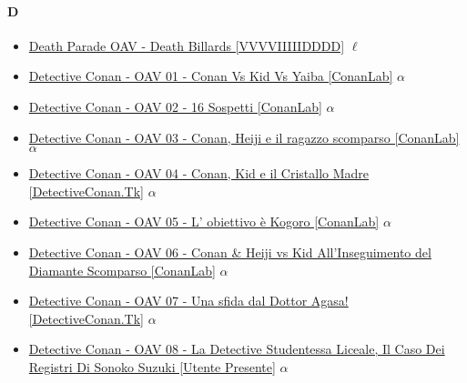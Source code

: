 			
		\paragraph{D} \hypertarget{OD}{}
			\begin{itemize}
				
				\item \href{https://mega.nz/#!rTRWQQBQ!IUJ2ek_EvBH3pUPuoJfsYFqzTUUDyRdXMZ48yZFay1Y} {Death Parade OAV - Death Billards [VVVVIIIIIDDDD]}  $\ell$   \\ 
				\item \href{https://mega.nz/#!9I8DhAoT!emtuSehpMr5CKseotyt5LFYb5sGwWfCU8kiga-ykeRs} {Detective Conan - OAV 01 - Conan Vs Kid Vs Yaiba [ConanLab]}  $\alpha$   \\ 
				\item \href{https://mega.nz/#!kQkHWARA!xxnoauQD3ulM5rS8aRJW2CLtaNuilP9X-mCr_GCB7Y4} {Detective Conan - OAV 02 - 16 Sospetti [ConanLab]}  $\alpha$   \\ 
				\item \href{https://mega.nz/#!5cUAWQ6A!FEAAstu6UVtJxRvAP2NTy9xPn3uZvRv2GJ3a3SJAK8s} {Detective Conan - OAV 03 - Conan, Heiji e il ragazzo scomparso [ConanLab]}  $\alpha$   \\ 
				\item \href{https://mega.nz/#!1I8wxYpI!-uFHEJs6pTecKJsATF6vuv3dWd2pXE_75OwbkrujQ_o} {Detective Conan - OAV 04 - Conan, Kid e il Cristallo Madre [DetectiveConan.Tk]}  $\alpha$   \\ 
				\item \href{https://mega.nz/#!4MVxSBKS!c_7F3Hc-caYVqQN-fwzx5QmHTDK5HQweziOIjUu4hGk} {Detective Conan - OAV 05 - L' obiettivo è Kogoro [ConanLab]}  $\alpha$   \\ 
				\item \href{https://mega.nz/#!IQUDBAhC!6gHxhYiYaYdXgpRXb_UkpYkqUKDtazecnfj1RtKrMzY} {Detective Conan - OAV 06 - Conan \& Heiji vs Kid All'Inseguimento del Diamante Scomparso [ConanLab]}  $\alpha$   \\ 
				\item \href{https://mega.nz/#!tI0xyKyb!CPgGrFhGL2GE2jLA5-UaLu9zHZn-O8Z_TosGfU0jLW4} {Detective Conan - OAV 07 - Una sfida dal Dottor Agasa! [DetectiveConan.Tk]}  $\alpha$   \\ 
				\item \href{https://mega.nz/#!IA9CkB4Q!svokDXEegwTj1OyPG7l0cUl8OwnG7BSnuvMoDzFnamE} {Detective Conan - OAV 08 - La Detective Studentessa Liceale, Il Caso Dei Registri Di Sonoko Suzuki [Utente Presente]}  $\alpha$   \\ 

\end{itemize}
